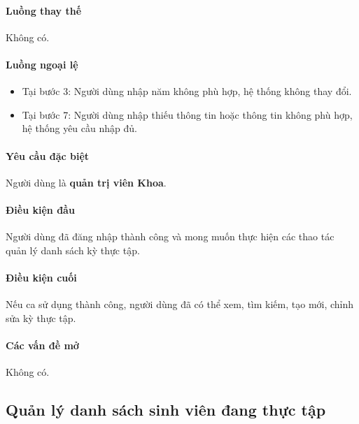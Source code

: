 \documentclass[./../main.tex]{subfiles}
\begin{document}
\paragraph*{Luồng thay thế} Không có.

\paragraph*{Luồng ngoại lệ}

\begin{itemize}
	\item

	      Tại bước 3: Người dùng nhập năm không phù hợp, hệ thống không thay đổi.

	\item

	      Tại bước 7: Người dùng nhập thiếu thông tin hoặc thông tin không phù hợp, hệ thống yêu cầu nhập đủ.

\end{itemize}

\paragraph*{Yêu cầu đặc biệt}

Người dùng là \textbf{quản trị viên Khoa}.

\paragraph*{Điều kiện đầu}

Người dùng đã đăng nhập thành công và mong muốn thực hiện các thao tác quản lý danh sách kỳ thực tập.

\paragraph*{Điều kiện cuối}

Nếu ca sử dụng thành công, người dùng đã có thể xem, tìm kiếm, tạo mới, chỉnh sửa kỳ thực tập.

\paragraph*{Các vấn đề mở}

Không có.

\subsection{Quản lý danh sách sinh viên đang thực tập}
\end{document}
